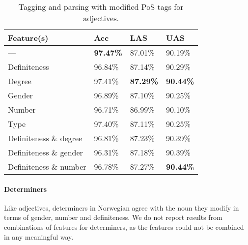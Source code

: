 \documentclass[11pt,a4paper]{article}
\begin{document}
\begin{table}
    \centering
    \smaller[0.5]
    \begin{tabular}{@{}llll@{}}
        \toprule
        \textbf{Feature(s)} & \textbf{Acc} & \textbf{LAS} & \textbf{UAS}
        \\
        \midrule
        --- & \textbf{97.47\%} & 87.01\% & 90.19\% \\
        Definiteness & 96.84\% & 87.14\% & 90.29\% \\
        Degree & 97.41\% & \textbf{87.29\%} & \textbf{90.44\%} \\
        Gender & 96.89\% & 87.10\% & 90.25\% \\
        Number & 96.71\% & 86.99\% & 90.10\% \\
        Type & 97.40\% & 87.11\% & 90.25\% \\
        Definiteness \& degree & 96.81\% & 87.23\% & 90.39\% \\
        Definiteness \& gender & 96.31\% & 87.18\% & 90.39\% \\
        Definiteness \& number & 96.78\% & 87.27\% & \textbf{90.44\%} \\
        \bottomrule
    \end{tabular}
    \caption{Tagging and parsing with modified PoS tags for adjectives.}
    \label{adjresults}
\end{table}

\paragraph{Determiners}
Like adjectives, determiners in Norwegian agree with the noun they modify in
terms of gender, number and definiteness. We do not report results from
combinations of features for determiners, as the features could not be combined
in any meaningful way.

\end{document}
